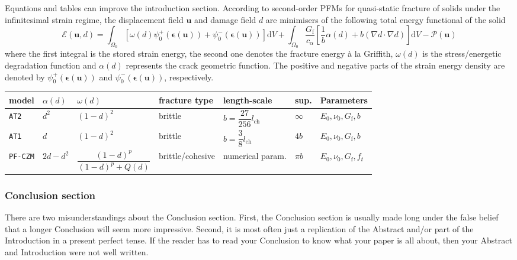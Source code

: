 \documentclass[authoryear,3p,times,preprint,review,fleqn]{elsarticle}
\newcommand{\bfepsilon}{\boldsymbol{\epsilon}}
\newcommand{\bfu}{\boldsymbol{u}}
\newcommand{\td}{\text{d}}
\numberwithin{equation}{section}
\theoremstyle{remark}
\begin{document}
\begin{MyBox}[label={algo-static-FEM}]
{Equations and tables can improve the introduction section.}
According to second-order PFMs for quasi-static fracture of solids under the infinitesimal strain regime, the displacement field $\bfu$ and damage field $d$ are minimisers of the following total energy functional of the solid 
\begin{equation*}
  \mathscr{E} (\bfu, d) 
    = \int_{\varOmega_{0}} \left[\omega(d)\psi_{0}^+(\bfepsilon (\bfu)) + \psi_{0}^-(\bfepsilon (\bfu)) \right]\td V
    + \int_{\varOmega_{0}}  \frac{G_\text{f}}{c_\alpha} \left[ \frac{1}{b} \alpha(d)
    + b \left( \nabla d \cdot \nabla d \right) \right] \td V
    - \mathscr{P} (\bfu)
\label{eq:3}
\end{equation*}
where the first integral is the stored strain energy, the second one denotes the fracture energy \`a la Griffith, $\omega(d)$ is the stress/energetic degradation function 
and  $\alpha(d)$ represents the crack geometric function. The positive and negative parts of the strain energy density are denoted by $\psi_{0}^+(\bfepsilon (\bfu))$ and $\psi_{0}^-(\bfepsilon (\bfu))$, respectively.\\

 \begin{tabularx}{\textwidth}{lllllll}
   \toprule
 model & $\alpha(d)$ &  $\omega(d)$    & fracture type & length-scale & sup.  & Parameters\\
   \midrule     
  \texttt{AT2} & $d^2$  & $(1 - d)^{2}$  & brittle  & $b=\dfrac{27}{256} l_{\text{ch}}$ & $\infty$ & $E_0,\nu_0,G_\text{f},b$ \\
  \texttt{AT1} & $d$    & $(1 - d)^{2}$ &  brittle  & $b=\dfrac{3}{8} l_{\text{ch}}$ & $4b$  & $E_0,\nu_0,G_\text{f},b$\\
  \texttt{PF-CZM} & $2d-d^2$ & $\dfrac{(1 - d)^p}{(1 - d)^p + Q(d)}$ &  brittle/cohesive  & numerical param. & $\pi b$  & $E_0,\nu_0,G_\text{f},f_t$\\
   \bottomrule
 \end{tabularx}%
\end{MyBox}

\subsubsection{Conclusion section}\label{sec:conclusion-part}

There are two misunderstandings about the Conclusion section. First, the Conclusion section is usually made long under the false belief that a longer Conclusion will seem more impressive. Second, it is most often just a replication of the Abstract and/or part of the Introduction in a present perfect tense. If the reader has to read your Conclusion to know what your paper is all about, then your Abstract and Introduction were not well written.
\end{document}
